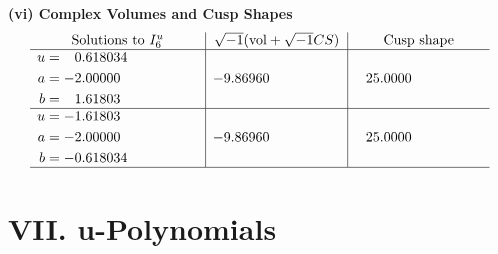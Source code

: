 \documentclass[1p]{elsarticle_modified}
\theoremstyle{definition}
\newcommand{\I}{\sqrt{-1}}
\begin{document}
\newpage\flushleft \textbf{(vi) Complex Volumes and Cusp Shapes}
$$\begin{array}{c|c|c}  
\text{Solutions to }I^u_{6}& \I (\text{vol} + \sqrt{-1}CS) & \text{Cusp shape}\\
 \hline 
\begin{aligned}
u &= \phantom{-}0.618034\phantom{ +0.000000I} \\
a &= -2.00000\phantom{ +0.000000I} \\
b &= \phantom{-}1.61803\phantom{ +0.000000I}\end{aligned}
 & -9.86960\phantom{ +0.000000I} & \phantom{-}25.0000\phantom{ +0.000000I} \\ \hline\begin{aligned}
u &= -1.61803\phantom{ +0.000000I} \\
a &= -2.00000\phantom{ +0.000000I} \\
b &= -0.618034\phantom{ +0.000000I}\end{aligned}
 & -9.86960\phantom{ +0.000000I} & \phantom{-}25.0000\phantom{ +0.000000I}\\
 \hline 
 \end{array}$$\newpage
\newpage\renewcommand{\arraystretch}{1}
\centering \section*{ VII. u-Polynomials}
\end{document}
